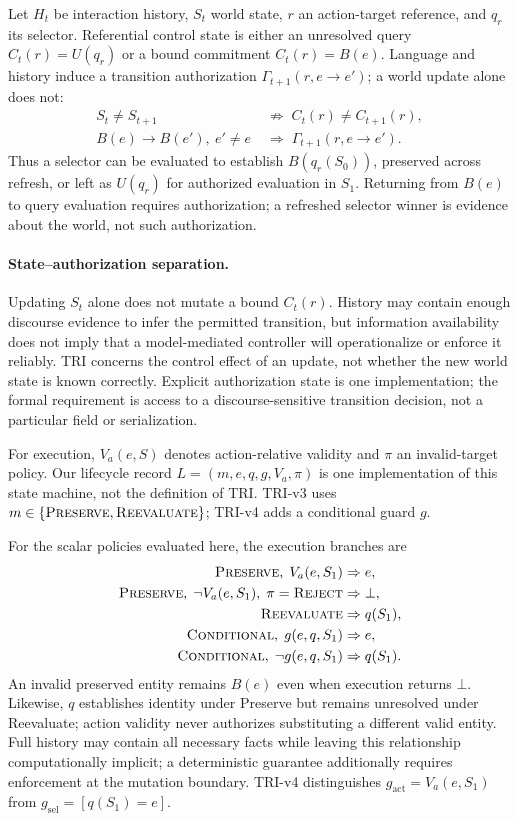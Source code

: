 \documentclass[letterpaper]{article}
\begin{document}
Let $H_t$ be interaction history, $S_t$ world state, $r$ an action-target reference, and $q_r$
its selector. Referential control state is either an unresolved query $C_t(r)=U(q_r)$ or a bound
commitment $C_t(r)=B(e)$. Language and history induce a transition authorization
$\Gamma_{t+1}(r,e\!\rightarrow\!e')$; a world update alone does not:
\begin{equation}
\begin{aligned}
S_t\ne S_{t+1}&\;\not\Rightarrow\;C_t(r)\ne C_{t+1}(r),\\
B(e)\to B(e'),\ e'\ne e&\;\Rightarrow\;\Gamma_{t+1}(r,e\to e').
\end{aligned}
\end{equation}
Thus a selector can be evaluated to establish $B(q_r(S_0))$, preserved across refresh, or left
as $U(q_r)$ for authorized evaluation in $S_1$. Returning from $B(e)$ to query evaluation requires
authorization; a refreshed selector winner is evidence about the world, not such authorization.

\paragraph{State--authorization separation.}
Updating $S_t$ alone does not mutate a bound $C_t(r)$. History may contain enough discourse
evidence to infer the permitted transition, but information availability does not imply that a
model-mediated controller will operationalize or enforce it reliably. TRI concerns the control
effect of an update, not whether the new world state is known correctly. Explicit authorization
state is one implementation; the formal requirement is access to a discourse-sensitive transition
decision, not a particular field or serialization.

For execution, $V_a(e,S)$ denotes action-relative validity and $\pi$ an invalid-target policy.
Our lifecycle record $L=(m,e,q,g,V_a,\pi)$ is one implementation of this state machine, not the
definition of TRI. TRI-v3 uses $m\in\{\textsc{Preserve},\textsc{Reevaluate}\}$; TRI-v4 adds a
conditional guard $g$.

For the scalar policies evaluated here, the execution branches are
\begin{align}
\textsc{Preserve},\;V_a(e,S_1) &\Rightarrow e, \\
\textsc{Preserve},\;\neg V_a(e,S_1),\;\pi=\textsc{Reject} &\Rightarrow \bot, \\
\textsc{Reevaluate} &\Rightarrow q(S_1), \\
\textsc{Conditional},\;g(e,q,S_1) &\Rightarrow e, \\
\textsc{Conditional},\;\neg g(e,q,S_1) &\Rightarrow q(S_1).
\end{align}
An invalid preserved entity remains $B(e)$ even when execution returns $\bot$.
Likewise, $q$ establishes identity under Preserve but remains unresolved under Reevaluate;
action validity never authorizes substituting a different valid entity. Full history may contain
all necessary facts while leaving this relationship computationally implicit; a deterministic
guarantee additionally requires enforcement at the mutation boundary. TRI-v4 distinguishes
$g_{\mathrm{act}}=V_a(e,S_1)$ from $g_{\mathrm{sel}}=[q(S_1)=e]$.
\end{document}
